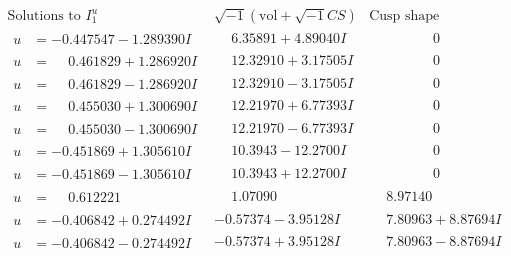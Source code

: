 \documentclass[1p]{elsarticle_modified}
\theoremstyle{definition}
\newcommand{\I}{\sqrt{-1}}
\begin{document}
$$\begin{array}{c|c|c}
\text{Solutions to }I^u_{1}& \I (\text{vol} + \sqrt{-1}CS) & \text{Cusp shape}\\
 \hline 
\begin{aligned}
u &= -0.447547 - 1.289390 I\end{aligned}
 & \phantom{-}6.35891 + 4.89040 I & \phantom{-0.000000 } 0 \\ \hline\begin{aligned}
u &= \phantom{-}0.461829 + 1.286920 I\end{aligned}
 & \phantom{-}12.32910 + 3.17505 I & \phantom{-0.000000 } 0 \\ \hline\begin{aligned}
u &= \phantom{-}0.461829 - 1.286920 I\end{aligned}
 & \phantom{-}12.32910 - 3.17505 I & \phantom{-0.000000 } 0 \\ \hline\begin{aligned}
u &= \phantom{-}0.455030 + 1.300690 I\end{aligned}
 & \phantom{-}12.21970 + 6.77393 I & \phantom{-0.000000 } 0 \\ \hline\begin{aligned}
u &= \phantom{-}0.455030 - 1.300690 I\end{aligned}
 & \phantom{-}12.21970 - 6.77393 I & \phantom{-0.000000 } 0 \\ \hline\begin{aligned}
u &= -0.451869 + 1.305610 I\end{aligned}
 & \phantom{-}10.3943 - 12.2700 I & \phantom{-0.000000 } 0 \\ \hline\begin{aligned}
u &= -0.451869 - 1.305610 I\end{aligned}
 & \phantom{-}10.3943 + 12.2700 I & \phantom{-0.000000 } 0 \\ \hline\begin{aligned}
u &= \phantom{-}0.612221\phantom{ +0.000000I}\end{aligned}
 & \phantom{-}1.07090\phantom{ +0.000000I} & \phantom{-}8.97140\phantom{ +0.000000I} \\ \hline\begin{aligned}
u &= -0.406842 + 0.274492 I\end{aligned}
 & -0.57374 - 3.95128 I & \phantom{-}7.80963 + 8.87694 I \\ \hline\begin{aligned}
u &= -0.406842 - 0.274492 I\end{aligned}
 & -0.57374 + 3.95128 I & \phantom{-}7.80963 - 8.87694 I \\ \hline\begin{aligned}

\end{aligned}
\end{array}$$
\end{document}
